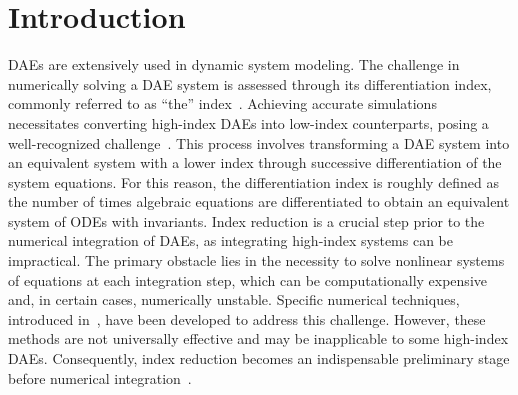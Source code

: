 
\section{Introduction}
\label{chap6:sec:introduction}

\acp{DAE} are extensively used in dynamic system modeling. The challenge in numerically solving a \ac{DAE} system is assessed through its differentiation index, commonly referred to as ``the'' index~\cite{campbell1995index}. Achieving accurate simulations necessitates converting high-index \acp{DAE} into low-index counterparts, posing a well-recognized challenge~\cite{petzold1982differential}. This process involves transforming a \ac{DAE} system into an equivalent system with a lower index through successive differentiation of the system equations. For this reason, the differentiation index is roughly defined as the number of times algebraic equations are differentiated to obtain an equivalent system of \acp{ODE} with invariants. Index reduction is a crucial step prior to the numerical integration of \acp{DAE}, as integrating high-index systems can be impractical. The primary obstacle lies in the necessity to solve nonlinear systems of equations at each integration step, which can be computationally expensive and, in certain cases, numerically unstable. Specific numerical techniques, introduced in~\cite{petzold1982differential, thomsen1999numerical, baumgarte1972stabilization}, have been developed to address this challenge. However, these methods are not universally effective and may be inapplicable to some high-index \acp{DAE}. Consequently, index reduction becomes an indispensable preliminary stage before numerical integration~\cite{lamour2013differential}.

